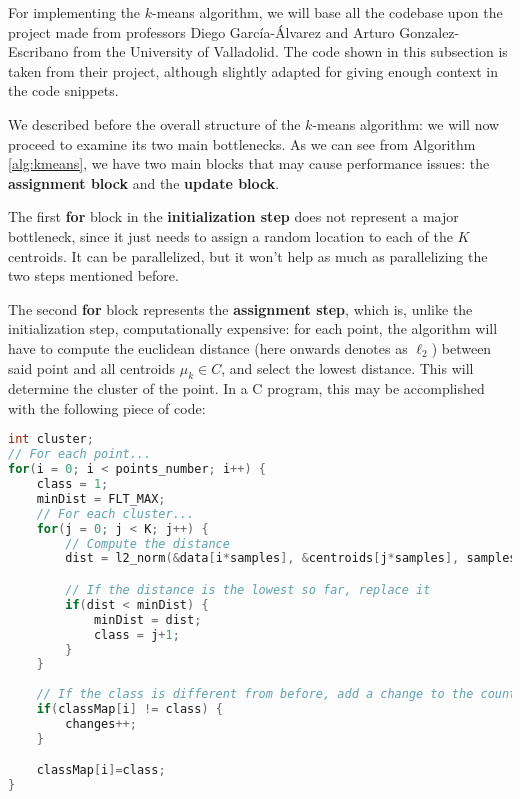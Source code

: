 \documentclass[11pt, journal]{IEEEtran}
\newcommand{\nwl}{

\vspace{11pt}

}
\begin{document}
For implementing the $k$-means algorithm, we will base all the codebase upon the project made from professors Diego García-Álvarez and Arturo Gonzalez-Escribano from the University of Valladolid. The code shown in this subsection is taken from their project, although slightly adapted for giving enough context in the code snippets.
\nwl
We described before the overall structure of the $k$-means algorithm: we will now proceed to examine its two main bottlenecks. As we can see from Algorithm \ref{alg:kmeans}, we have two main blocks that may cause performance issues: the \textbf{assignment block} and the \textbf{update block}.
\nwl
The first \textbf{for} block in the \textbf{initialization step} does not represent a major bottleneck, since it just needs to assign a random location to each of the $K$ centroids. It can be parallelized, but it won't help as much as parallelizing the two steps mentioned before.
\nwl
The second \textbf{for} block represents the \textbf{assignment step}, which is, unlike the initialization step, computationally expensive: for each point, the algorithm will have to compute the euclidean distance (here onwards denotes as $\ell_2$) between said point and all centroids $\mu_k \in C$, and select the lowest distance. This will determine the cluster of the point. In a C program, this may be accomplished with the following piece of code:
\nwl
\begin{lstlisting}[language = C]
int cluster;
// For each point...
for(i = 0; i < points_number; i++) {
    class = 1;
    minDist = FLT_MAX;
    // For each cluster...
    for(j = 0; j < K; j++) {
        // Compute the distance
        dist = l2_norm(&data[i*samples], &centroids[j*samples], samples);

        // If the distance is the lowest so far, replace it
        if(dist < minDist) {
            minDist = dist;
            class = j+1;
        }
    }
    
    // If the class is different from before, add a change to the counter
    if(classMap[i] != class) {
        changes++;
    }

    classMap[i]=class;
}\end{lstlisting}
\end{document}
